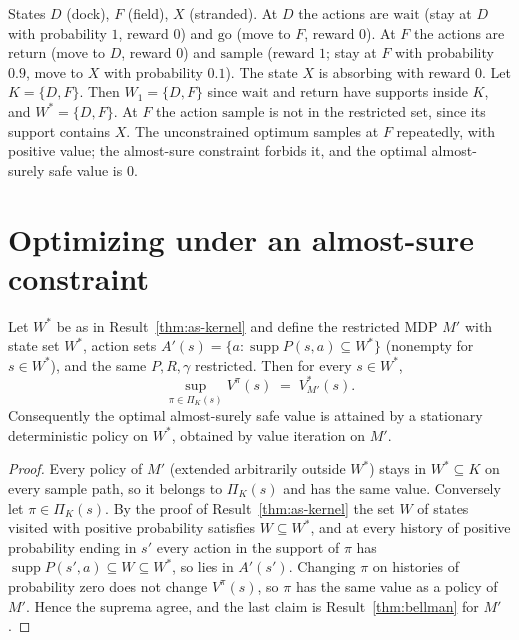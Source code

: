 \begin{example}\label{ex:excursion}
States $D$ (dock), $F$ (field), $X$ (stranded). At $D$ the actions are $\mathrm{wait}$ (stay at $D$ with probability $1$, reward $0$) and $\mathrm{go}$ (move to $F$, reward $0$). At $F$ the actions are $\mathrm{return}$ (move to $D$, reward $0$) and $\mathrm{sample}$ (reward $1$; stay at $F$ with probability $0.9$, move to $X$ with probability $0.1$). The state $X$ is absorbing with reward $0$. Let $K=\{D,F\}$. Then $W_1=\{D,F\}$ since $\mathrm{wait}$ and $\mathrm{return}$ have supports inside $K$, and $W^{*}=\{D,F\}$. At $F$ the action $\mathrm{sample}$ is not in the restricted set, since its support contains $X$. The unconstrained optimum samples at $F$ repeatedly, with positive value; the almost-sure constraint forbids it, and the optimal almost-surely safe value is $0$.
\end{example}

\section{Optimizing under an almost-sure constraint}

\begin{newresult}\label{thm:restriction}
Let $W^{*}$ be as in Result~\ref{thm:as-kernel} and define the restricted MDP $M'$ with state set $W^{*}$, action sets $A'(s)=\{a:\operatorname{supp}P(s,a)\subseteq W^{*}\}$ (nonempty for $s\in W^{*}$), and the same $P,R,\gamma$ restricted. Then for every $s\in W^{*}$,
\[
\sup_{\pi\in\Pi_K(s)}V^{\pi}(s)\;=\;V^{*}_{M'}(s).
\]
Consequently the optimal almost-surely safe value is attained by a stationary deterministic policy on $W^{*}$, obtained by value iteration on $M'$.
\end{newresult}
\begin{proof}
Every policy of $M'$ (extended arbitrarily outside $W^{*}$) stays in $W^{*}\subseteq K$ on every sample path, so it belongs to $\Pi_K(s)$ and has the same value. Conversely let $\pi\in\Pi_K(s)$. By the proof of Result~\ref{thm:as-kernel} the set $W$ of states visited with positive probability satisfies $W\subseteq W^{*}$, and at every history of positive probability ending in $s'$ every action in the support of $\pi$ has $\operatorname{supp}P(s',a)\subseteq W\subseteq W^{*}$, so lies in $A'(s')$. Changing $\pi$ on histories of probability zero does not change $V^{\pi}(s)$, so $\pi$ has the same value as a policy of $M'$. Hence the suprema agree, and the last claim is Result~\ref{thm:bellman} for $M'$.
\end{proof}


